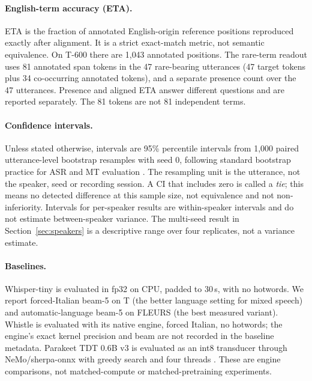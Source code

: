 \documentclass{article}
\begin{document}
\paragraph{English-term accuracy (ETA).}
ETA is the fraction of annotated English-origin reference positions reproduced exactly after
alignment. It is a strict exact-match metric, not semantic equivalence. On T-600 there are 1{,}043
annotated positions. The rare-term readout uses 81 annotated span tokens in the 47 rare-bearing
utterances (47 target tokens plus 34 co-occurring annotated tokens), and a separate presence
count over the 47 utterances. Presence and aligned ETA answer different questions and are
reported separately. The 81 tokens are not 81 independent terms.

\paragraph{Confidence intervals.}
Unless stated otherwise, intervals are 95\% percentile intervals from 1{,}000 paired
utterance-level bootstrap resamples with seed 0, following standard bootstrap practice for ASR and
MT evaluation \citep{efron1993bootstrap,bisani2004bootstrap,koehn2004statistical}. The resampling unit is
the utterance, not the speaker, seed or recording session. A CI that includes zero is called a
\emph{tie}; this means no detected difference at this sample size, not equivalence and not
non-inferiority. Intervals for per-speaker results are within-speaker intervals and do not
estimate between-speaker variance. The multi-seed result in Section~\ref{sec:speakers} is a
descriptive range over four replicates, not a variance estimate.

\paragraph{Baselines.}
Whisper-tiny \citep{radford2023whisper} is evaluated in fp32 on CPU, padded to 30\,s, with no
hotwords. We report forced-Italian beam-5 on T (the better language setting for mixed speech) and
automatic-language beam-5 on FLEURS (the best measured variant). Whistle \citep{cactus2024whistle}
is evaluated with its native engine, forced Italian, no hotwords; the engine's exact kernel
precision and beam are not recorded in the baseline metadata. Parakeet TDT 0.6B v3 is evaluated
as an int8 transducer through NeMo/sherpa-onnx with greedy search and four threads
\citep{nemo2024}. These are engine comparisons, not matched-compute or matched-pretraining
experiments.
\end{document}
